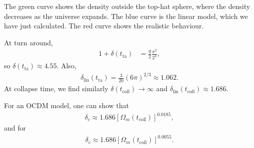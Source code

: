 The green curve shows the density outside the top-hat sphere, where the density decreases as the universe expands.
The blue curve is the linear model, which we have just calculated.
The red curve shows the realistic behaviour.

At turn around,
\begin{align*}
	1 + \delta(t_\text{ta})
	&= \frac{9}{2} \frac{\pi^2}{2^{3}},
\end{align*}
so $\delta(t_\text{ta}) \approx 4.55$. Also,
\begin{align*}
	\delta_\text{lin}(t_\text{ta})
	= \frac{3}{20} (6\pi)^{2/3}
	\approx 1.062.
\end{align*}
At collapse time, we find similarly $\delta(t_\text{coll}) \to \infty$ and $\delta_\text{lin}(t_\text{coll}) \approx 1.686$.

For an OCDM model, one can show that 
\begin{align*}
	\delta_c \approx 1.686 [\Omega_m(t_\text{coll})]^{0.0185},
\end{align*}
and for %
\begin{align*}
	\delta_c \approx 1.686 [\Omega_m(t_\text{coll})]^{0.0055}.
\end{align*}






























